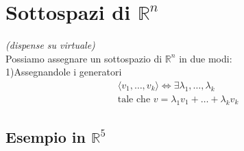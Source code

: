 \documentclass[a4paper,12pt]{article}
\begin{document}
\section{Sottospazi di $\mathbb{R}^n$}
\textit{(dispense su virtuale)}
\\Possiamo assegnare un sottospazio di $\mathbb{R}^n$ in due modi:
\\1)Assegnandole i generatori
\begin{align*}
    \langle v_1,\dots,v_k \rangle \iff \exists \lambda_1,\dots,\lambda_k \\
    \text{tale che } v=\lambda_1 v_1 + \dots + \lambda_k v_k
\end{align*}
\subsection{Esempio in $\mathbb{R}^5$}
\end{document}
